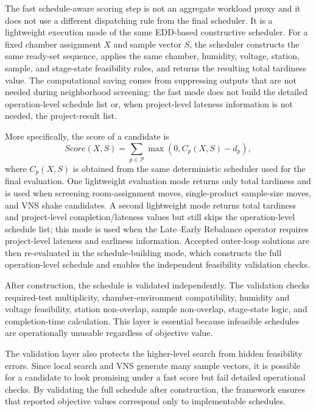 \documentclass[11pt]{article}
\begin{document}
The fast schedule-aware scoring step is not an aggregate workload proxy and it does not use a different dispatching rule from the final scheduler. It is a lightweight execution mode of the same EDD-based constructive scheduler. For a fixed chamber assignment \(X\) and sample vector \(S\), the scheduler constructs the same ready-set sequence, applies the same chamber, humidity, voltage, station, sample, and stage-state feasibility rules, and returns the resulting total tardiness value. The computational saving comes from suppressing outputs that are not needed during neighborhood screening: the fast mode does not build the detailed operation-level schedule list or, when project-level lateness information is not needed, the project-result list.

More specifically, the score of a candidate is
\[
Score(X,S)=\sum_{p\in\mathcal{P}}\max(0,C_p(X,S)-d_p),
\]
where \(C_p(X,S)\) is obtained from the same deterministic scheduler used for the final evaluation. One lightweight evaluation mode returns only total tardiness and is used when screening room-assignment moves, single-product sample-size moves, and VNS shake candidates. A second lightweight mode returns total tardiness and project-level completion/lateness values but still skips the operation-level schedule list; this mode is used when the Late--Early Rebalance operator requires project-level lateness and earliness information. Accepted outer-loop solutions are then re-evaluated in the schedule-building mode, which constructs the full operation-level schedule and enables the independent feasibility validation checks.

After construction, the schedule is validated independently. The validation checks required-test multiplicity, chamber-environment compatibility, humidity and voltage feasibility, station non-overlap, sample non-overlap, stage-state logic, and completion-time calculation. This layer is essential because infeasible schedules are operationally unusable regardless of objective value.

The validation layer also protects the higher-level search from hidden feasibility errors. Since local search and VNS generate many sample vectors, it is possible for a candidate to look promising under a fast score but fail detailed operational checks. By validating the full schedule after construction, the framework ensures that reported objective values correspond only to implementable schedules.
\end{document}
